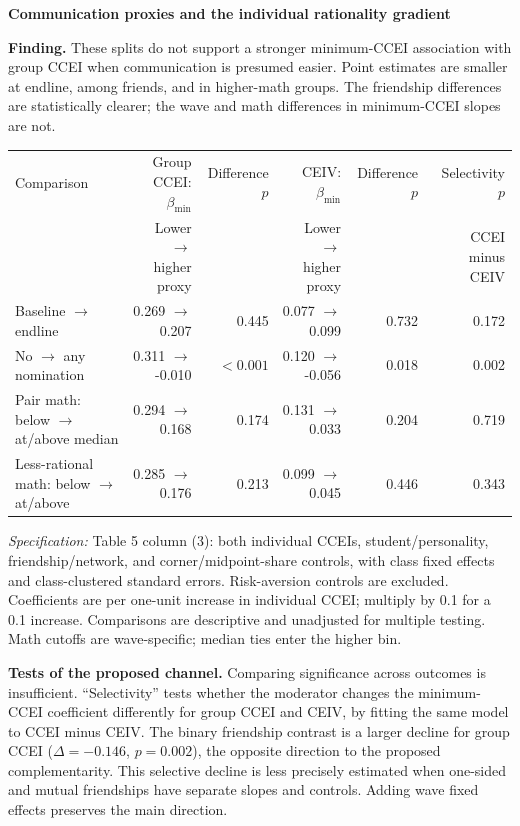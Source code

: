 \documentclass[11pt]{article}
\begin{document}
\begin{center}\Large\textbf{Communication proxies and the individual rationality gradient}\end{center}
\textbf{Finding.} These splits do not support a stronger minimum-CCEI association with group CCEI when communication
is presumed easier. Point estimates are smaller at endline, among friends, and in higher-math groups. The friendship
differences are statistically clearer; the wave and math differences in minimum-CCEI slopes are not.

\begin{center}\small
\begin{tabular}{lrrrrr}\toprule
Comparison & Group CCEI: $\beta_{\min}$ & Difference $p$ & CEIV: $\beta_{\min}$ & Difference $p$ & Selectivity $p$\\
& Lower $\to$ higher proxy & & Lower $\to$ higher proxy & & CCEI minus CEIV\\\midrule
Baseline $\to$ endline & 0.269 $\to$ 0.207 & 0.445 & 0.077 $\to$ 0.099 & 0.732 & 0.172\\
No $\to$ any nomination & 0.311 $\to$ -0.010 & $<0.001$ & 0.120 $\to$ -0.056 & 0.018 & 0.002\\
Pair math: below $\to$ at/above median & 0.294 $\to$ 0.168 & 0.174 & 0.131 $\to$ 0.033 & 0.204 & 0.719\\
Less-rational math: below $\to$ at/above & 0.285 $\to$ 0.176 & 0.213 & 0.099 $\to$ 0.045 & 0.446 & 0.343\\
\bottomrule\end{tabular}\end{center}
\small
\textit{Specification:} Table 5 column (3): both individual CCEIs, student/personality, friendship/network, and
corner/midpoint-share controls, with class fixed effects and class-clustered standard errors. Risk-aversion controls
are excluded. Coefficients are per one-unit increase in individual CCEI; multiply by 0.1 for a 0.1 increase. Comparisons
are descriptive and unadjusted for multiple testing. Math cutoffs are wave-specific; median ties enter the higher bin.

\textbf{Tests of the proposed channel.} Comparing significance across outcomes is insufficient. ``Selectivity'' tests
whether the moderator changes the minimum-CCEI coefficient differently for group CCEI and CEIV, by fitting the same
model to CCEI minus CEIV. The binary friendship contrast is a larger decline for group CCEI ($\Delta=-0.146$, $p=0.002$),
the opposite direction to the proposed complementarity. This selective decline is less precisely estimated when
one-sided and mutual friendships have separate slopes and controls. Adding wave fixed effects preserves the main direction.
\end{document}
